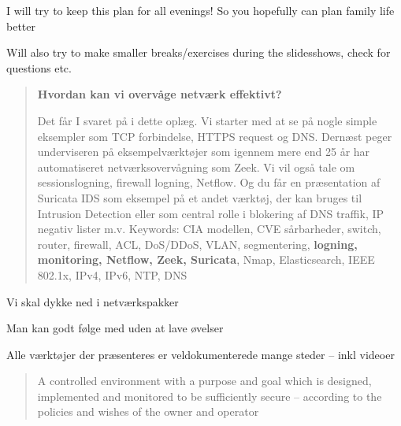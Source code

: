 \documentclass[Screen16to9,17pt]{foils}
\begin{document}
\centerline{I will try to keep this plan for all evenings! So you hopefully can plan family life better}

Will also try to make smaller breaks/exercises during the slidesshows, check for questions etc.





\begin{quote}
{\bf \large Hvordan kan vi overvåge netværk effektivt?}

    Det får I svaret på i dette oplæg. Vi starter med at se på nogle simple eksempler som TCP forbindelse, HTTPS request og DNS. Dernæst peger underviseren på eksempelværktøjer som igennem mere end 25 år har automatiseret netværksovervågning som Zeek. Vi vil også tale om sessionslogning, firewall logning, Netflow. Og du får en præsentation af Suricata IDS som eksempel på et andet værktøj, der kan bruges til Intrusion Detection eller som central rolle i blokering af DNS traffik, IP negativ lister m.v.
\vskip 5mm
Keywords: CIA modellen, CVE sårbarheder, switch, router, firewall, ACL, DoS/DDoS, VLAN, segmentering, {\bf logning, monitoring, Netflow, Zeek, Suricata}, Nmap, Elasticsearch, IEEE 802.1x, IPv4, IPv6, NTP, DNS
\end{quote}

\begin{list2}
\item Vi skal dykke ned i netværkspakker
\item Man kan godt følge med uden at lave øvelser
\item Alle værktøjer der præsenteres er veldokumenterede mange steder -- inkl videoer
\end{list2}





\begin{list2}
\item
\end{list2}








\begin{quote}
A controlled environment with a purpose and goal which is designed, implemented and monitored to be sufficiently secure -- according to the policies and wishes of the owner and operator
\end{quote}
\end{document}
